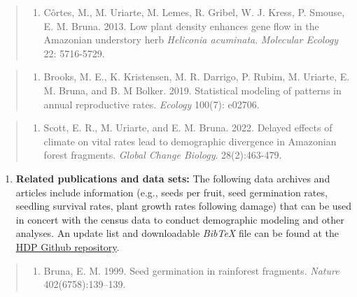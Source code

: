 \documentclass[
  12pt,
  man, donotrepeattitle,floatsintext]{apa6}
\providecommand{\tightlist}{%
  \setlength{\itemsep}{0pt}\setlength{\parskip}{0pt}}
\begin{document}
\begin{quote}
\begin{enumerate}
\def\labelenumi{\arabic{enumi}.}
\setcounter{enumi}{13}
\tightlist
\item
  Côrtes, M., M. Uriarte, M. Lemes, R. Gribel, W. J. Kress, P. Smouse, E. M. Bruna. 2013. Low plant density enhances gene flow in the Amazonian understory herb \emph{Heliconia acuminata}. \emph{Molecular Ecology} 22: 5716-5729.
\end{enumerate}
\end{quote}

\begin{quote}
\begin{enumerate}
\def\labelenumi{\arabic{enumi}.}
\setcounter{enumi}{14}
\tightlist
\item
  Brooks, M. E., K. Kristensen, M. R. Darrigo, P. Rubim, M. Uriarte, E. M. Bruna, and B. M Bolker. 2019. Statistical modeling of patterns in annual reproductive rates. \emph{Ecology} 100(7): e02706.
\end{enumerate}
\end{quote}

\begin{quote}
\begin{enumerate}
\def\labelenumi{\arabic{enumi}.}
\setcounter{enumi}{15}
\tightlist
\item
  Scott, E. R., M. Uriarte, and E. M. Bruna. 2022. Delayed effects of climate on vital rates lead to demographic divergence in Amazonian forest fragments. \emph{Global Change Biology}. 28(2):463-479.
\end{enumerate}
\end{quote}

\begin{enumerate}
\def\labelenumi{\arabic{enumi}.}
\setcounter{enumi}{1}
\tightlist
\item
  \textbf{Related publications and data sets:} The following data archives and articles include information (e.g., seeds per fruit, seed germination rates, seedling survival rates, plant growth rates following damage) that can be used in concert with the census data to conduct demographic modeling and other analyses. An update list and downloadable \emph{BibTeX} file can be found at the \href{https://github.com/BrunaLab/HeliconiaSurveys}{HDP Github repository}.
\end{enumerate}

\begin{quote}
\begin{enumerate}
\def\labelenumi{\arabic{enumi}.}
\tightlist
\item
  Bruna, E. M. 1999. Seed germination in rainforest fragments. \emph{Nature} 402(6758):139--139.
\end{enumerate}
\end{quote}
\end{document}
